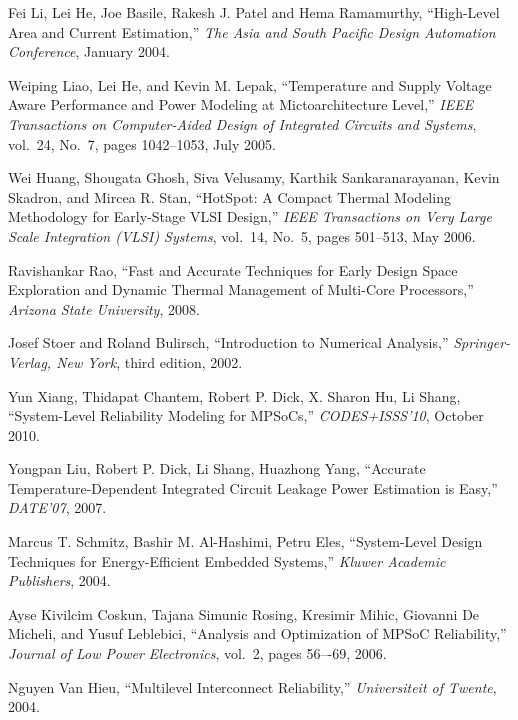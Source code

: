 \begin{thebibliography}{99}
    Fei Li, Lei He, Joe Basile, Rakesh J. Patel and Hema Ramamurthy,
    ``High-Level Area and Current Estimation,''
    \emph{The Asia and South Pacific Design Automation Conference},
    January 2004.

    Weiping Liao, Lei He, and Kevin M. Lepak,
    ``Temperature and Supply Voltage Aware Performance and Power Modeling at Mictoarchitecture Level,''
    \emph{IEEE Transactions on Computer-Aided Design of Integrated Circuits and Systems},
    vol.~24, No.~7, pages 1042--1053, July 2005.

    Wei Huang, Shougata Ghosh, Siva Velusamy, Karthik Sankaranarayanan, Kevin Skadron, and Mircea R. Stan,
    ``HotSpot: A Compact Thermal Modeling Methodology for Early-Stage VLSI Design,''
    \emph{IEEE Transactions on Very Large Scale Integration (VLSI) Systems},
    vol.~14, No.~5, pages 501--513, May 2006.

    Ravishankar Rao,
    ``Fast and Accurate Techniques for Early Design Space Exploration and Dynamic Thermal Management of Multi-Core Processors,''
    \emph{Arizona State University},
    2008.

    Josef Stoer and Roland Bulirsch,
    ``Introduction to Numerical Analysis,''
    \emph{Springer-Verlag, New York},
    third edition, 2002.

    Yun Xiang, Thidapat Chantem, Robert P. Dick, X. Sharon Hu, Li Shang,
    ``System-Level Reliability Modeling for MPSoCs,''
    \emph{CODES+ISSS'10},
    October 2010.

    Yongpan Liu, Robert P. Dick, Li Shang, Huazhong Yang,
    ``Accurate Temperature-Dependent Integrated Circuit Leakage Power Estimation is Easy,''
    \emph{DATE'07},
    2007.

    Marcus T. Schmitz, Bashir M. Al-Hashimi, Petru Eles,
    ``System-Level Design Techniques for Energy-Efficient Embedded Systems,''
    \emph{Kluwer Academic Publishers},
    2004.

    Ayse Kivilcim Coskun, Tajana Simunic Rosing, Kresimir Mihic, Giovanni De Micheli, and Yusuf Leblebici,
    ``Analysis and Optimization of MPSoC Reliability,''
    \emph{Journal of Low Power Electronics},
    vol.~2, pages 56–-69, 2006.

    Nguyen Van Hieu,
    ``Multilevel Interconnect Reliability,''
    \emph{Universiteit of Twente},
    2004.


\end{thebibliography}
